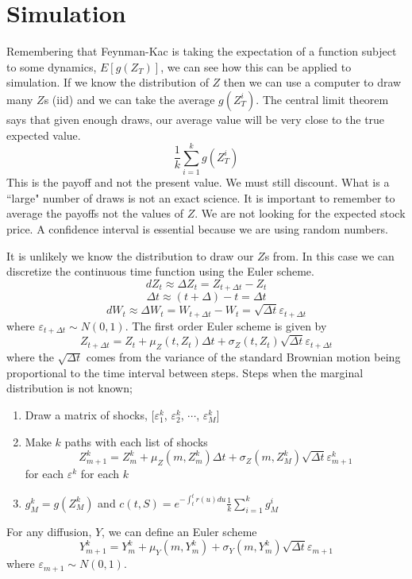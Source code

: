 
\section{Simulation}

Remembering that Feynman-Kac is taking the expectation of a function subject to
some dynamics, $E[g(Z_T)]$, we can see how this can be applied to simulation.
If we know the distribution of $Z$ then we can use a computer to draw many
$Z$s (iid) and we can take the average $g(Z_T^i)$.
The central limit theorem says that given enough draws, our average value will
be very close to the true expected value.
\[\frac{1}{k}\sum_{i=1}^kg(Z_T^i)\]
This is the payoff and not the present value. We must still discount.
What is a ``large" number of draws is  not an exact science.
It is important to remember to average the payoffs  not the values of $Z$.
We are not looking for the expected stock price.
A  confidence interval is essential because we are using random numbers.

It is unlikely we know the distribution to draw our $Z$s from. In this case we
can discretize the continuous time function using the Euler scheme.
\[dZ_t\approx\Delta Z_t=Z_{t+\Delta t}-Z_t\]
\[\Delta t\approx (t+\Delta)-t=\Delta t\]
\[
    dW_t\approx\Delta W_t=W_{t+\Delta t}-W_t=
    \sqrt{\Delta t}\varepsilon_{t+\Delta t}
\]
where $\varepsilon_{t+\Delta t}\sim N(0,1)$.
The first order Euler scheme is given by
\[
    Z_{t+\Delta t}=Z_t+\mu_Z(t,Z_t)\Delta t+\sigma_Z(t,Z_t)\sqrt{\Delta t}
    \varepsilon_{t+\Delta t}
\]
where the $\sqrt{\Delta t}$ comes from the variance of the standard Brownian
motion being proportional to the time interval between steps.
Steps when the marginal distribution is not known;
\begin{enumerate}
  \item Draw a matrix of shocks, [$\varepsilon_1^k$, $\varepsilon_2^k$,
    $\cdots$, $\varepsilon_M^k$]
  \item Make $k$ paths with each list of shocks
    \[
        Z_{m+1}^k=Z_m^k+\mu_Z(m,Z_m^k)\Delta t+\sigma_Z(m,Z_M^k)\sqrt{\Delta t}
        \varepsilon_{m+1}^k
    \]
    for each $\varepsilon^k$ for each $k$
  \item $g_M^k=g(Z_M^k)$ and
    $c(t,S)=e^{-\int_t^tr(u)du}\frac{1}{k}\sum_{i=1}^kg_M^i$
\end{enumerate}
For any diffusion, $Y$, we can define an Euler scheme
\[
    Y_{m+1}^k=Y_m^k+\mu_Y(m,Y_m^k)+
    \sigma_Y(m,Y_m^k)\sqrt{\Delta t}\varepsilon_{m+1}
\]
where $\varepsilon_{m+1}\sim N(0,1)$.

